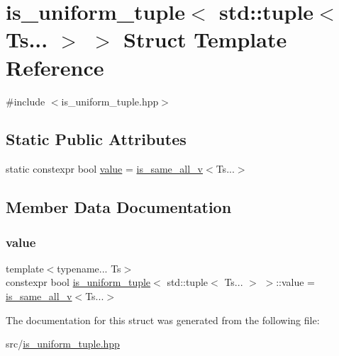 \hypertarget{structis__uniform__tuple_3_01std_1_1tuple_3_01Ts_8_8_8_01_4_01_4}{}\section{is\+\_\+uniform\+\_\+tuple$<$ std\+:\+:tuple$<$ Ts... $>$ $>$ Struct Template Reference}
\label{structis__uniform__tuple_3_01std_1_1tuple_3_01Ts_8_8_8_01_4_01_4}


{\ttfamily \#include $<$is\+\_\+uniform\+\_\+tuple.\+hpp$>$}

\subsection*{Static Public Attributes}
\begin{DoxyCompactItemize}
\item 
static constexpr bool \hyperlink{structis__uniform__tuple_3_01std_1_1tuple_3_01Ts_8_8_8_01_4_01_4_ae218f20e67acacb3596b3247ffd7438c}{value} = \hyperlink{is__uniform__tuple_8hpp_a8f9339dd3f878ad76e81f7a03785284d}{is\+\_\+same\+\_\+all\+\_\+v}$<$Ts...$>$
\end{DoxyCompactItemize}


\subsection{Member Data Documentation}
\mbox{\label{structis__uniform__tuple_3_01std_1_1tuple_3_01Ts_8_8_8_01_4_01_4_ae218f20e67acacb3596b3247ffd7438c}} 
\subsubsection{\texorpdfstring{value}{value}}
{\footnotesize\ttfamily template$<$typename... Ts$>$ \\
constexpr bool \hyperlink{structis__uniform__tuple}{is\+\_\+uniform\+\_\+tuple}$<$ std\+::tuple$<$ Ts... $>$ $>$\+::value = \hyperlink{is__uniform__tuple_8hpp_a8f9339dd3f878ad76e81f7a03785284d}{is\+\_\+same\+\_\+all\+\_\+v}$<$Ts...$>$\hspace{0.3cm}{\ttfamily [static]}}



The documentation for this struct was generated from the following file\+:\begin{DoxyCompactItemize}
\item 
src/\hyperlink{is__uniform__tuple_8hpp}{is\+\_\+uniform\+\_\+tuple.\+hpp}\end{DoxyCompactItemize}
